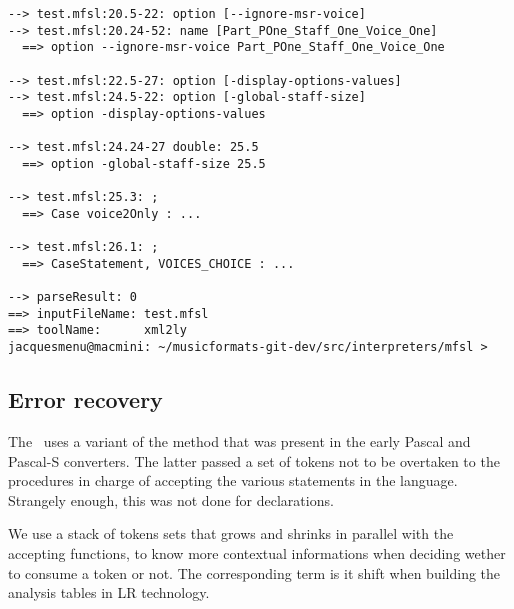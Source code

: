 \begin{lstlisting}[language=Terminal]
--> test.mfsl:20.5-22: option [--ignore-msr-voice]
--> test.mfsl:20.24-52: name [Part_POne_Staff_One_Voice_One]
  ==> option --ignore-msr-voice Part_POne_Staff_One_Voice_One

--> test.mfsl:22.5-27: option [-display-options-values]
--> test.mfsl:24.5-22: option [-global-staff-size]
  ==> option -display-options-values

--> test.mfsl:24.24-27 double: 25.5
  ==> option -global-staff-size 25.5

--> test.mfsl:25.3: ;
  ==> Case voice2Only : ...

--> test.mfsl:26.1: ;
  ==> CaseStatement, VOICES_CHOICE : ...

--> parseResult: 0
==> inputFileName: test.mfsl
==> toolName:      xml2ly
jacquesmenu@macmini: ~/musicformats-git-dev/src/interpreters/mfsl >
\end{lstlisting}


\subsection{Error recovery}

The \mfslInterp\ uses a variant of the  method that was present in the early Pascal and Pascal-S converters. The latter passed a set of tokens not to be overtaken to the procedures in charge of accepting the various statements in the language. Strangely enough, this was not done for declarations.

We use a stack of tokens sets that grows and shrinks in parallel with the accepting functions, to know more contextual informations when deciding wether to consume a token or not. The corresponding term is {it shift}
when building the analysis tables in LR technology.


